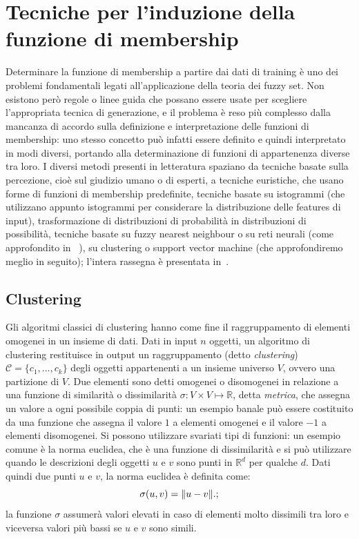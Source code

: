 \documentclass[oneside, openany]{book}
\DeclarePairedDelimiter{\norma}{\lVert}{\rVert}
\begin{document}
		\chapter[Induzione della funzione di membership]{Tecniche per l'induzione della funzione di membership}
		\label{chap:2}
		Determinare la funzione di membership a partire dai dati di training è uno dei problemi fondamentali legati all'applicazione della teoria dei fuzzy set. Non esistono però regole o linee guida che possano essere usate per scegliere l'appropriata tecnica di generazione, e il problema è reso più complesso dalla mancanza di accordo sulla definizione e interpretazione delle funzioni di membership: uno stesso concetto può infatti essere definito e quindi interpretato in modi diversi, portando alla determinazione di funzioni di appartenenza diverse tra loro. I diversi metodi presenti in letteratura spaziano da tecniche basate sulla percezione, cioè sul giudizio umano o di esperti, a tecniche euristiche, che usano forme di funzioni di membership predefinite, tecniche basate su istogrammi (che utilizzano appunto istogrammi per considerare la distribuzione delle features di input), trasformazione di distribuzioni di probabilità in distribuzioni di possibilità, tecniche basate su fuzzy nearest neighbour o su reti neurali (come approfondito in ~\cite{bib:rita}), su clustering o support vector machine (che approfondiremo meglio in seguito); l'intera rassegna è presentata in~\cite{bib:rassegna}.
		
		\section{Clustering}
		Gli algoritmi classici di clustering hanno come fine il raggruppamento di elementi omogenei in un insieme di dati. Dati in input $n$ oggetti, un algoritmo di clustering restituisce in output un raggruppamento (detto \textit{clustering}) $\mathcal{C}=\{c_1, ..., c_k\}$ degli oggetti appartenenti a un insieme universo $V$, ovvero una partizione di $V$. Due elementi sono detti omogenei o disomogenei in relazione a una funzione di similarità o dissimilarità $\sigma: V\times V\mapsto \mathbb{R}$, detta \textit{metrica}, che assegna un valore a ogni possibile coppia di punti: un esempio banale può essere costituito da una funzione che assegna il valore $1$ a elementi omogenei e il valore $-1$ a elementi disomogenei. Si possono utilizzare svariati tipi di funzioni: un esempio comune è la norma euclidea, che è una funzione di dissimilarità e si può utilizzare quando le descrizioni degli oggetti $u$ e $v$ sono punti in $\mathbb R^d$ per qualche $d$. Dati quindi due punti $u$ e $v$, la norma euclidea è definita come:
		\[
			\sigma(u, v) = \norma{u - v}\text{.}\text{;}
		\]
		la funzione $\sigma$ assumerà valori elevati in caso di elementi molto dissimili tra loro e viceversa valori più bassi se $u$ e $v$ sono simili.
		
\end{document}
